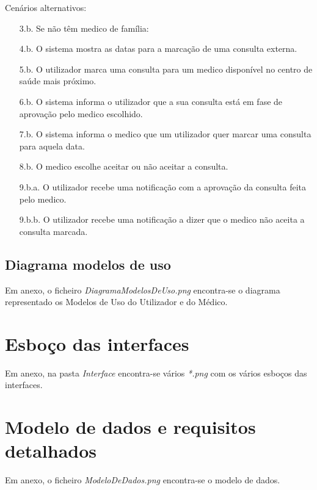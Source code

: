 \documentclass[12pt, a4paper, twoside]{report} %
\begin{document}
\noindent Cenários alternativos:
	\begin{enumerate}
	\item [3.b.] Se não têm medico de família:
	\item [4.b.] O sistema mostra as datas para a marcação de uma consulta externa.
	\item [5.b.] O utilizador marca uma consulta para um medico disponível no centro de saúde mais próximo.
	\item [6.b.] O sistema informa o utilizador que a sua consulta está em fase de aprovação pelo medico escolhido.
	\item [7.b.] O sistema informa o medico que um utilizador quer marcar uma consulta para aquela data.
	\item [8.b.] O medico escolhe aceitar ou não aceitar a consulta.
	\item [9.b.a.] O utilizador recebe uma notificação com a aprovação da consulta feita pelo medico.
	\item [9.b.b.] O utilizador recebe uma notificação a dizer que o medico não aceita a consulta marcada.
	\end{enumerate}


\subsection{Diagrama modelos de uso}

Em anexo, o ficheiro \textit{DiagramaModelosDeUso.png} encontra-se o diagrama representado os Modelos de Uso do Utilizador e do Médico.

\section{Esboço das interfaces}

Em anexo, na pasta \textit{Interface} encontra-se vários \textit{*.png} com os vários esboços das interfaces.

\section{Modelo de dados e requisitos detalhados}

Em anexo, o ficheiro \textit{ModeloDeDados.png} encontra-se o modelo de dados.

\end{document}
